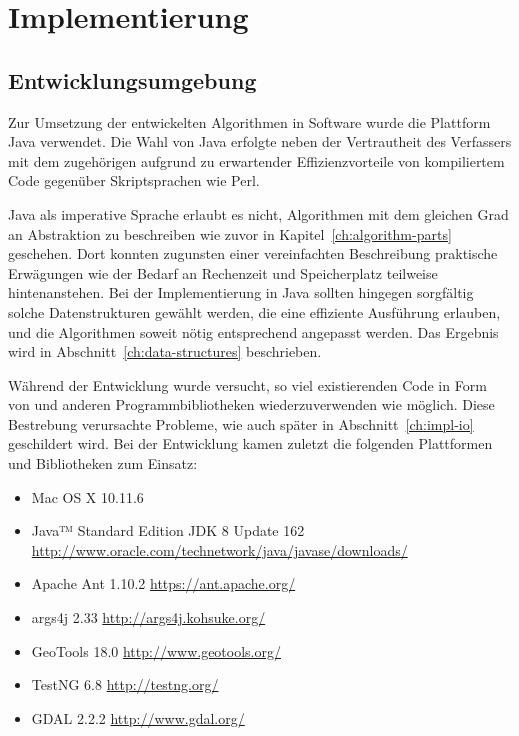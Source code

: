 \documentclass[../main/thesis.tex]{subfiles}
\begin{document}
\chapter{Implementierung}
\label{ch:impl}

\section{Entwicklungsumgebung}
\label{ch:impl-env}

Zur Umsetzung der entwickelten Algorithmen in Software wurde die Plattform Java verwendet.
Die Wahl von Java erfolgte neben der Vertrautheit des Verfassers mit dem zugehörigen  aufgrund zu erwartender Effizienzvorteile von kompiliertem Code gegenüber Skriptsprachen wie Perl.

Java als imperative Sprache erlaubt es nicht, Algorithmen mit dem gleichen Grad an Abstraktion zu beschreiben wie zuvor in Kapitel~\ref{ch:algorithm-parts} geschehen.
Dort konnten zugunsten einer vereinfachten
Beschreibung praktische Erwägungen wie der Bedarf an Rechenzeit und Speicherplatz teilweise hintenanstehen.
Bei der Implementierung in Java sollten hingegen sorgfältig solche Datenstrukturen gewählt werden, die eine effiziente Ausführung erlauben, und die Algorithmen soweit nötig entsprechend angepasst werden.
Das Ergebnis wird in Abschnitt~\ref{ch:data-structures} beschrieben.

Während der Entwicklung wurde versucht, so viel existierenden Code in Form von  und anderen Programmbibliotheken wiederzuverwenden wie möglich.
Diese Bestrebung verursachte Probleme, wie auch später in Abschnitt~\ref{ch:impl-io} geschildert wird.
Bei der Entwicklung kamen zuletzt die folgenden Plattformen und Bibliotheken zum Einsatz:

\begin{itemize}[nosep]
	\item Mac OS X 10.11.6
	\item Java™ Standard Edition JDK 8 Update 162\\ \url{http://www.oracle.com/technetwork/java/javase/downloads/}
	\item Apache Ant 1.10.2 \quad \url{https://ant.apache.org/}
	\item args4j 2.33 \quad \url{http://args4j.kohsuke.org/}
	\item GeoTools 18.0 \quad \url{http://www.geotools.org/}
	\item TestNG 6.8 \quad \url{http://testng.org/}
	\item GDAL 2.2.2 \quad \url{http://www.gdal.org/}
\end{itemize}
\end{document}
